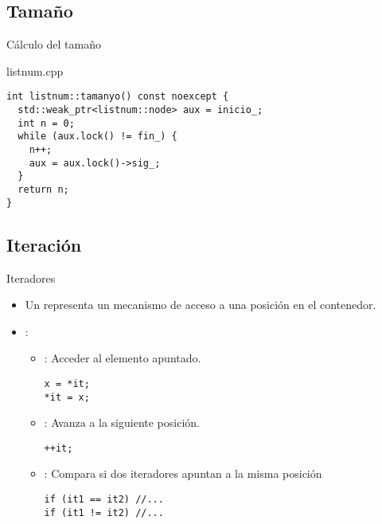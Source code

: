\subsection{Tamaño}

\begin{frame}[t,fragile]{Cálculo del tamaño}
\begin{block}{listnum.cpp}
\begin{lstlisting}
int listnum::tamanyo() const noexcept {
  std::weak_ptr<listnum::node> aux = inicio_;
  int n = 0;
  while (aux.lock() != fin_) {
    n++;
    aux = aux.lock()->sig_;
  }
  return n;
}
\end{lstlisting}
\end{block}
\end{frame}

\subsection{Iteración}

\begin{frame}[t,fragile]{Iteradores}
\begin{itemize}
  \item Un  representa un mecanismo de acceso a una posición
        en el contenedor.

  \item {}:
    \begin{itemize}
      \item {}: Acceder al elemento apuntado.
\begin{lstlisting}
x = *it;
*it = x;
\end{lstlisting}

      \pause
      \item {}: Avanza a la siguiente posición.
\begin{lstlisting}
++it;
\end{lstlisting}

      \pause
      \item {}: Compara si dos iteradores apuntan a la misma posición
\begin{lstlisting}
if (it1 == it2) //...
if (it1 != it2) //...
\end{lstlisting}
    \end{itemize}
\end{itemize}
\end{frame}

